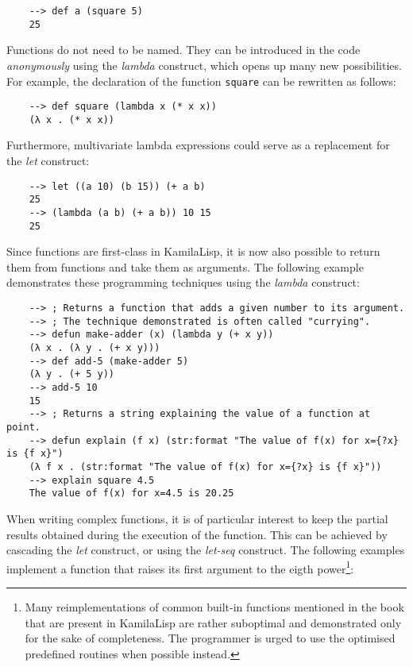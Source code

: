 \begin{Verbatim}
    --> def a (square 5)
    25
\end{Verbatim}

Functions do not need to be named. They can be introduced in the code \textit{anonymously} using the \textit{lambda} construct, which opens up many new possibilities. For example, the declaration of the function \verb|square| can be rewritten as follows:

\begin{Verbatim}
    --> def square (lambda x (* x x))
    (λ x . (* x x))
\end{Verbatim}

Furthermore, multivariate lambda expressions could serve as a replacement for the \textit{let} construct:

\begin{Verbatim}
    --> let ((a 10) (b 15)) (+ a b)
    25
    --> (lambda (a b) (+ a b)) 10 15
    25
\end{Verbatim}

Since functions are first-class in KamilaLisp, it is now also possible to return them from functions and take them as arguments. The following example demonstrates these programming techniques using the \textit{lambda} construct:

\begin{Verbatim}
    --> ; Returns a function that adds a given number to its argument.
    --> ; The technique demonstrated is often called "currying".
    --> defun make-adder (x) (lambda y (+ x y))
    (λ x . (λ y . (+ x y)))
    --> def add-5 (make-adder 5)
    (λ y . (+ 5 y))
    --> add-5 10
    15
    --> ; Returns a string explaining the value of a function at point.
    --> defun explain (f x) (str:format "The value of f(x) for x={?x} is {f x}")
    (λ f x . (str:format "The value of f(x) for x={?x} is {f x}"))
    --> explain square 4.5
    The value of f(x) for x=4.5 is 20.25
\end{Verbatim}

When writing complex functions, it is of particular interest to keep the partial results obtained during the execution of the function. This can be achieved by cascading the \textit{let} construct, or using the \textit{let-seq} construct. The following examples implement a function that raises its first argument to the eigth power\footnote{Many reimplementations of common built-in functions mentioned in the book that are present in KamilaLisp are rather suboptimal and demonstrated only for the sake of completeness. The programmer is urged to use the optimised predefined routines when possible instead.}:

